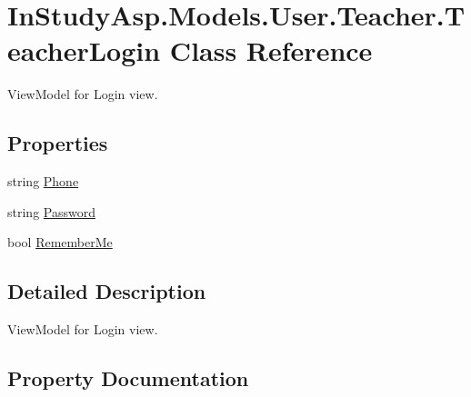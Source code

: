 \hypertarget{class_in_study_asp_1_1_models_1_1_user_1_1_teacher_1_1_teacher_login}{}\section{In\+Study\+Asp.\+Models.\+User.\+Teacher.\+Teacher\+Login Class Reference}
\label{class_in_study_asp_1_1_models_1_1_user_1_1_teacher_1_1_teacher_login}


View\+Model for Login view.  


\subsection*{Properties}
\begin{DoxyCompactItemize}
\item 
string \hyperlink{class_in_study_asp_1_1_models_1_1_user_1_1_teacher_1_1_teacher_login_a88af6a4fab232581547fa72201bd9c24}{Phone}
\item 
string \hyperlink{class_in_study_asp_1_1_models_1_1_user_1_1_teacher_1_1_teacher_login_a702ecd92b34f4af62c5aa3c1d376d6d6}{Password}
\item 
bool \hyperlink{class_in_study_asp_1_1_models_1_1_user_1_1_teacher_1_1_teacher_login_a480ce8419873d4a2ce46ab25f36a2535}{Remember\+Me}
\end{DoxyCompactItemize}


\subsection{Detailed Description}
View\+Model for Login view. 

\subsection{Property Documentation}
\mbox{\label{class_in_study_asp_1_1_models_1_1_user_1_1_teacher_1_1_teacher_login_a702ecd92b34f4af62c5aa3c1d376d6d6}} 
